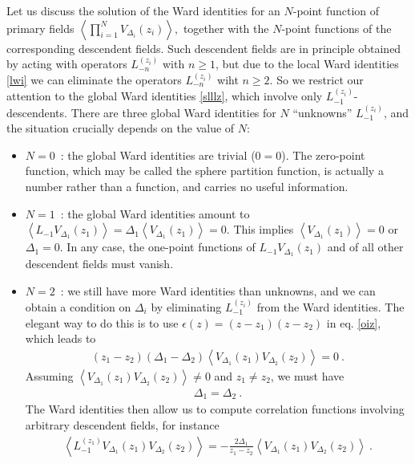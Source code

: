\documentclass[12pt,a4paper,notitlepage]{report}
\numberwithin{equation}{section}
\theoremstyle{break}
\begin{document}
Let us discuss the solution of the Ward identities for an $N$-point function of primary fields
$
\left\langle \prod_{i=1}^N V_{\Delta_i}(z_i) \right\rangle ,
$
together with the $N$-point functions of the corresponding descendent fields.
Such descendent fields are in principle obtained by acting with operators $L_{-n}^{(z_i)}$ with $n\geq 1$, but due to the local Ward identities \eqref{lwi} we can eliminate the operators $L_{-n}^{(z_i)}$ wiht $n\geq 2$.
So we restrict our attention to the global Ward identities \eqref{slllz}, which involve only $L_{-1}^{(z_i)}$-descendents.
There are three global Ward identities for $N$ ``unknowns'' $L_{-1}^{(z_i)}$, and the situation crucially depends on the value of $N$:
\begin{itemize}
 \item $\boxed{N=0}$\ : the global Ward identities are trivial ($0=0$).
The zero-point function, which may be called the sphere partition function, is actually a number rather than a function, and carries no useful information.
\item $\boxed{N=1}$\ :  the global Ward identities amount to $\left\langle L_{-1}V_{\Delta_1}(z_1)\right\rangle  =\Delta_1 \left\langle V_{\Delta_1}(z_1)\right\rangle =0$.
This implies $\left\langle V_{\Delta_1}(z_1)\right\rangle=0$ or $\Delta_1=0$.
In any case, the one-point functions of $L_{-1}V_{\Delta_1}(z_1)$ and of all other descendent fields must vanish. 
\item $\boxed{N=2}$\ : we still have more Ward identities than unknowns, and we can obtain a condition on $\Delta_i$ by eliminating $L_{-1}^{(z_i)}$ from the Ward identities.
The elegant way to do this is to use $\epsilon(z)=(z-z_1)(z-z_2)$ in eq. \eqref{oiz}, which leads to 
\begin{align}
 (z_1-z_2)(\Delta_1-\Delta_2)\left\langle V_{\Delta_1}(z_1)V_{\Delta_2}(z_2)\right\rangle =0\ .
\end{align}
Assuming $\left\langle V_{\Delta_1}(z_1)V_{\Delta_2}(z_2)\right\rangle\neq 0$ and $z_1\neq z_2$, we must have 
\begin{align}
 \Delta_1 = \Delta_2 \ . 
\label{ded}
\end{align}
The Ward identities then allow us to compute correlation functions involving arbitrary descendent fields, for instance 
\begin{align}
  \left\langle L_{-1}^{(z_1)}V_{\Delta_1}(z_1)V_{\Delta_2}(z_2)\right\rangle= -\frac{2\Delta_1}{z_1-z_2}\left\langle V_{\Delta_1}(z_1)V_{\Delta_2}(z_2)\right\rangle \ .
\label{lzfz}
\end{align}

\end{itemize}
\end{document}
